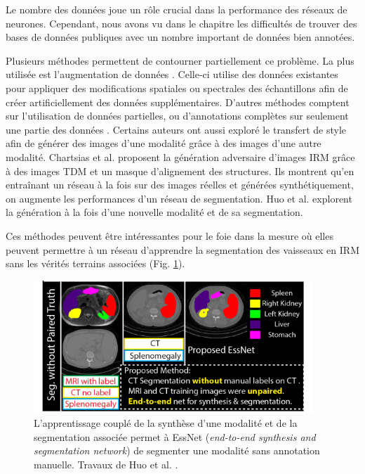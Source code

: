       Le nombre des données joue un rôle crucial dans la performance des réseaux de neurones. Cependant, nous avons vu dans le chapitre \chapContextN{} les difficultés de trouver des bases de données publiques avec un nombre important de données bien annotées. 

      Plusieurs méthodes permettent de contourner partiellement ce problème. La plus utilisée est l'augmentation de données \cite{Liskowski2016_data_augmentation}. Celle-ci utilise des données existantes pour appliquer des modifications spatiales ou spectrales des échantillons afin de créer artificiellement des données supplémentaires. D'autres méthodes comptent sur l'utilisation de données partielles, ou d'annotations complètes sur seulement une partie des données \cite{Tajbakhsh2020_imperfect_datasets}. Certains auteurs ont aussi exploré le transfert de style afin de générer des images d'une modalité grâce à des images d'une autre modalité. Chartsias et al. \cite{chartsias2017adversarial} proposent la génération adversaire d'images IRM grâce à des images TDM et un masque d'alignement des structures. Ils montrent qu'en entraînant un réseau à la fois sur des images réelles et générées synthétiquement, on augmente les performances d'un réseau de segmentation. Huo et al. \cite{Huo2018_adversarial} explorent la génération à la fois d'une nouvelle modalité et de sa segmentation.

      Ces méthodes peuvent être intéressantes pour le foie dans la mesure où elles peuvent permettre à un réseau d'apprendre la segmentation des vaisseaux en IRM sans les vérités terrains associées (Fig. \ref{fig:ESSNet}).
      \begin{figure}[!ht]
        \centering
        \includegraphics[height=5cm]{Images/ESSNET_application.png}
        \caption{L'apprentissage couplé de la synthèse d'une modalité et de la segmentation associée permet à EssNet (\textit{end-to-end synthesis and segmentation network}) de segmenter une modalité sans annotation manuelle. Travaux de Huo et al. \cite{Huo2018_adversarial}. }
        \label{fig:ESSNet}
      \end{figure}
